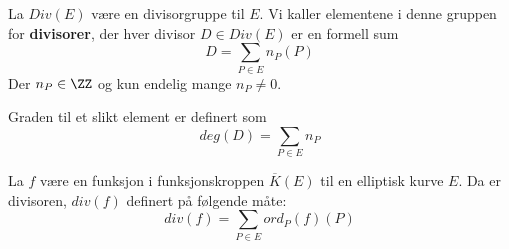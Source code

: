 \begin{definisjon}
La $Div(E)$ være en divisorgruppe til $E$. Vi kaller elementene i denne gruppen for \textbf{divisorer}, der hver divisor $D \in Div(E)$ er en formell sum $$D = \sum_{P\in E}n_P(P) $$
Der $n_P \in \ZZ$ og kun endelig mange $n_P \neq 0$.

Graden til et slikt element er definert som $$deg(D) = \sum_{P \in E} n_P$$
\end{definisjon}

\begin{definisjon}
La $f$ være en funksjon i funksjonskroppen $\overline{K}(E)$ til en elliptisk kurve $E$. Da er divisoren, $div(f)$ definert på følgende måte: $$div(f) = \sum_{P \in E} ord_P(f)(P)$$ 
\end{definisjon}


